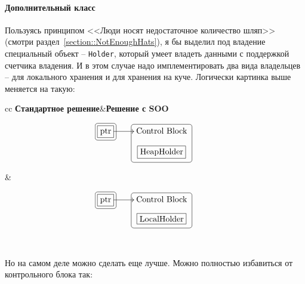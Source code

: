 \paragraph{Дополнительный класс}

Пользуясь принципом <<Люди носят недостаточное количество шляп>> (смотри раздел~\ref{section::NotEnoughHats}), я бы выделил под владение специальный объект -- \verb"Holder", который умеет владеть данными с поддержкой счетчика владения.
И в этом случае надо имплементировать два вида владельцев -- для локального хранения и для хранения на куче.
Логически картинка выше меняется на такую:
\begin{center}
\begin{tabular}{cc}
{\textbf{Стандартное решение}}&{\textbf{Решение с SOO}}\\
{
\begin{minipage}[\baselineskip]{6cm}
\[
\xymatrix@R=10pt{
  {\text{ptr}}\ar[r]
    	{
	\save
   [].[]*[F-]\frm{}
   \restore
	}
	    	{
	\save
   [].[]*+[F-:<3pt>]\frm{}
   \restore
	}
  &{\text{Control Block}}
      	{
	\save
   [].[d]*+[F-:<3pt>]\frm{}
   \restore
	}
  &{}\\
  {}
  &{\text{HeapHolder}}
      	{
	\save
   [].[]*[F-]\frm{}
   \restore
	}
  &{}\\
}
\]
\end{minipage}
}&{
\begin{minipage}[\baselineskip]{6cm}
\[
\xymatrix@R=10pt{
  {\text{ptr}}\ar[r]
    	{
	\save
   [].[]*[F-]\frm{}
   \restore
	}
	    	{
	\save
   [].[]*+[F-:<3pt>]\frm{}
   \restore
	}
  &{\text{Control Block}}
      	{
	\save
   [].[d]*+[F-:<3pt>]\frm{}
   \restore
	}
  &{}\\
  {}
  &{\text{LocalHolder}}
      	{
	\save
   [].[]*[F-]\frm{}
   \restore
	}
  &{}\\
}
\]
\end{minipage}
}\\
\end{tabular}
\end{center}
Но на самом деле можно сделать еще лучше.
Можно полностью избавиться от контрольного блока так:
